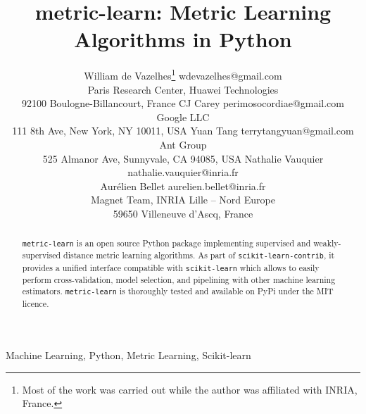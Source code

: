 \documentclass[twoside,11pt]{article}
\begin{document}
\title{metric-learn: Metric Learning Algorithms in Python}

\author{\name William de Vazelhes\thanks{Most of the work was carried out while the author was affiliated with INRIA, France.} \email wdevazelhes@gmail.com \\
       \addr Paris Research Center, Huawei Technologies\\
       92100 Boulogne-Billancourt, France
       \AND
       \name CJ Carey \email perimosocordiae@gmail.com \\
       \addr Google LLC \\
       111 8th Ave, New York, NY 10011, USA
       \AND
       \name Yuan Tang \email terrytangyuan@gmail.com \\
       \addr Ant Group \\ 
       525 Almanor Ave, Sunnyvale, CA 94085, USA
       \AND
       \name Nathalie Vauquier \email nathalie.vauquier@inria.fr \\
       \name Aur\'elien Bellet \email aurelien.bellet@inria.fr \\
       \addr Magnet Team, INRIA Lille – Nord Europe\\
       59650 Villeneuve d’Ascq, France
       }


\maketitle

\begin{abstract}%
\texttt{metric-learn} is an open source Python package implementing supervised and weakly-supervised distance metric learning algorithms. As part of \texttt{scikit-learn-contrib}, it provides a unified interface compatible with \texttt{scikit-learn} which allows to easily perform cross-validation, model selection, and pipelining with other machine learning estimators. \texttt{metric-learn} is thoroughly tested and available on PyPi under the MIT licence.
\end{abstract}

\begin{keywords}
  Machine Learning, Python, Metric Learning, Scikit-learn
\end{keywords}
\end{document}
